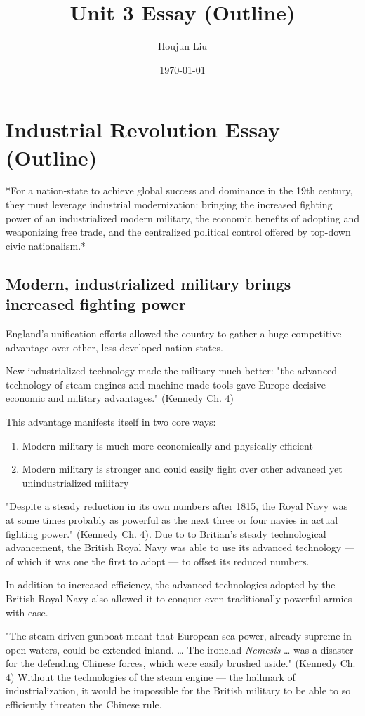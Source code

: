 \documentclass[letterpaper]{article}
\author{Houjun Liu}
\date{\today}
\title{Unit 3 Essay (Outline)}
\renewcommand{\tableofcontents}{}
\begin{document}
\tableofcontents



\section{Industrial Revolution Essay (Outline)}
\label{sec:orgc9b832f}
*For a nation-state to achieve global success and dominance in the 19th
century, they must leverage industrial modernization: bringing the
increased fighting power of an industrialized modern military, the
economic benefits of adopting and weaponizing free trade, and the
centralized political control offered by top-down civic nationalism.*

\subsection{Modern, industrialized military brings increased fighting power}
\label{sec:org05dfe48}
England's unification efforts allowed the country to gather a huge
competitive advantage over other, less-developed nation-states.

New industrialized technology made the military much better: "the
advanced technology of steam engines and machine-made tools gave Europe
decisive economic and military advantages." (Kennedy Ch. 4)

This advantage manifests itself in two core ways:

\begin{enumerate}
\item Modern military is much more economically and physically efficient
\item Modern military is stronger and could easily fight over other
advanced yet unindustrialized military
\end{enumerate}

"Despite a steady reduction in its own numbers after 1815, the Royal
Navy was at some times probably as powerful as the next three or four
navies in actual fighting power." (Kennedy Ch. 4). Due to to Britian's
steady technological advancement, the British Royal Navy was able to use
its advanced technology --- of which it was one the first to adopt ---
to offset its reduced numbers.

In addition to increased efficiency, the advanced technologies adopted
by the British Royal Navy also allowed it to conquer even traditionally
powerful armies with ease.

"The steam-driven gunboat meant that European sea power, already supreme
in open waters, could be extended inland. \ldots{} The ironclad \emph{Nemesis} \ldots{}
was a disaster for the defending Chinese forces, which were easily
brushed aside." (Kennedy Ch. 4) Without the technologies of the steam
engine --- the hallmark of industrialization, it would be impossible for
the British military to be able to so efficiently threaten the Chinese
rule.
\end{document}
